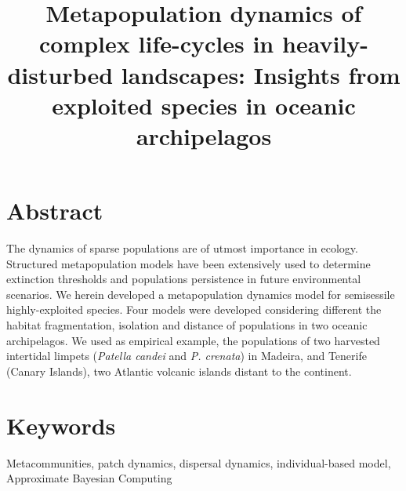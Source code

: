 \documentclass[12pt]{article}
\begin{document}
\title{Metapopulation dynamics of complex life-cycles in heavily-disturbed landscapes: Insights from exploited species in oceanic archipelagos}
\maketitle

\section{Abstract}
The dynamics of sparse populations are of utmost importance in ecology. Structured metapopulation models have been extensively used to determine extinction thresholds and populations persistence in future environmental scenarios. We herein developed a metapopulation dynamics model for semisessile highly-exploited species. Four models were developed considering different the habitat fragmentation, isolation and distance of populations in two oceanic archipelagos. We used as empirical example, the populations of two harvested intertidal limpets (\textit{Patella candei} and \textit{P. crenata}) in Madeira, and Tenerife (Canary Islands), two Atlantic volcanic islands distant to the continent.

\section{Keywords}
Metacommunities, patch dynamics, dispersal dynamics, individual-based model, Approximate Bayesian Computing
\end{document}
